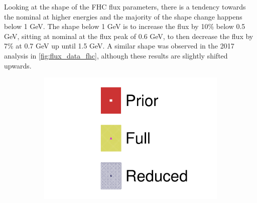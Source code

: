 Looking at the shape of the FHC flux parameters, there is a tendency towards the nominal at higher energies and the majority of the shape change happens below 1 GeV. The shape below 1 GeV is to increase the flux by 10\% below 0.5 GeV, sitting at nominal at the flux peak of 0.6 GeV, to then decrease the flux by 7\% at 0.7 GeV up until 1.5 GeV. A similar shape was observed in the 2017 analysis in \autoref{fig:flux_data_fhc}, although these results are slightly shifted upwards.
\begin{figure}[h]
	\centering
	\begin{subfigure}[t]{0.10\textwidth}
		\includegraphics[width=\textwidth,page=1, trim={0mm 0mm 0mm 9mm}, clip]{figures/mach3/2018/data/2018a_FixedCov_FullCov_Mpi_Data_merg_2018a_FixedCov_RedCov_Mpi_Data_merge}
	\end{subfigure}
	

\end{figure}
